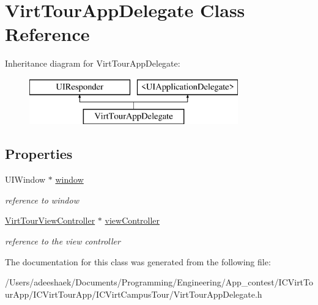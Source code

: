 \hypertarget{interface_virt_tour_app_delegate}{\section{Virt\-Tour\-App\-Delegate Class Reference}
\label{interface_virt_tour_app_delegate}
}
Inheritance diagram for Virt\-Tour\-App\-Delegate\-:\begin{figure}[H]
\begin{center}
\leavevmode
\includegraphics[height=2.000000cm]{interface_virt_tour_app_delegate}
\end{center}
\end{figure}
\subsection*{Properties}
\begin{DoxyCompactItemize}
\item 
\hypertarget{interface_virt_tour_app_delegate_ae04748cdefebda525b266731b6c120a2}{U\-I\-Window $\ast$ \hyperlink{interface_virt_tour_app_delegate_ae04748cdefebda525b266731b6c120a2}{window}}\label{interface_virt_tour_app_delegate_ae04748cdefebda525b266731b6c120a2}

\begin{DoxyCompactList}\small\item\em reference to window \end{DoxyCompactList}\item 
\hypertarget{interface_virt_tour_app_delegate_aaeeab4adf9d4b35d303d7a0f3f07cb6c}{\hyperlink{interface_virt_tour_view_controller}{Virt\-Tour\-View\-Controller} $\ast$ \hyperlink{interface_virt_tour_app_delegate_aaeeab4adf9d4b35d303d7a0f3f07cb6c}{view\-Controller}}\label{interface_virt_tour_app_delegate_aaeeab4adf9d4b35d303d7a0f3f07cb6c}

\begin{DoxyCompactList}\small\item\em reference to the view controller \end{DoxyCompactList}\end{DoxyCompactItemize}


The documentation for this class was generated from the following file\-:\begin{DoxyCompactItemize}
\item 
/\-Users/adeeshaek/\-Documents/\-Programming/\-Engineering/\-App\-\_\-contest/\-I\-C\-Virt\-Tour\-App/\-I\-C\-Virt\-Tour\-App/\-I\-C\-Virt\-Campus\-Tour/Virt\-Tour\-App\-Delegate.\-h\end{DoxyCompactItemize}
